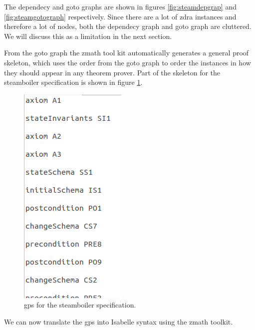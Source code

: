 The dependecy and goto graphs are shown in figures \ref{fig:steamdepgrap} and \ref{fig:steamgotograph} respectively. Since there are a lot of \gls{zdra} instances and therefore a lot of nodes, both the dependecy graph and goto graph are cluttered. We will discuss this as a limitation in the next section.

From the goto graph the \gls{zmath} tool kit automatically generates a general proof skeleton, which uses the order from the goto graph to order the instances in how they should appear in any theorem prover. Part of the skeleton for the steamboiler specification is shown in figure \ref{fig:steamgpsa}.

\begin{figure}[H]
\includegraphics[scale=0.5]{Figures/Evaluation/steamboilergpsa.png}
\caption{\Gls{gps} for the steamboiler specification. \label{fig:steamgpsa}}
\end{figure}

We can now translate the \gls{gps} into Isabelle syntax using the \gls{zmath} toolkit.


